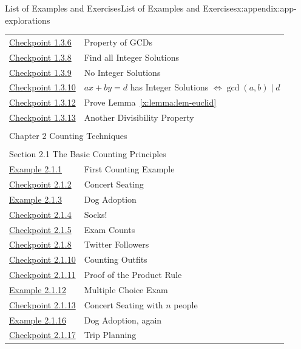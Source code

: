 \documentclass[oneside,10pt,]{book}
\newcommand{\xreffont}{\relax}
\numberwithin{equation}{section}
\begin{document}
\begin{appendixptx}{List of Examples and Exercises}{}{List of Examples and Exercises}{}{}{x:appendix:app-explorations}
\begin{longtable}[l]{ll}
\hyperref[x:exercise:ex-review-gcd-prop]{Checkpoint 1.3.6}& Property of GCDs\\
\hyperref[x:exercise:ex-review-bezout]{Checkpoint 1.3.8}& Find all Integer Solutions\\
\hyperref[x:exercise:ex-review-bezout-no-solution]{Checkpoint 1.3.9}& No Integer Solutions\\
\hyperref[x:exercise:ex-review-bezout-gcd]{Checkpoint 1.3.10}& \(ax + by = d\) has Integer Solutions \(\Leftrightarrow \gcd(a,b) \mid d\)\\
\hyperref[x:exercise:ex-review-euclid-proof]{Checkpoint 1.3.12}& Prove Lemma~{\xreffont\ref*{x:lemma:lem-euclid}}\\
\hyperref[x:exercise:ex-review-bezout-euclid]{Checkpoint 1.3.13}& Another Divisibility Property\\
\multicolumn{2}{l}{\null}\\[1.5ex] \multicolumn{2}{l}{\large Chapter 2 Counting Techniques}\\[0.5ex]
\multicolumn{2}{l}{\null}\\[1.5ex] \multicolumn{2}{l}{\large Section 2.1 The Basic Counting Principles}\\[0.5ex]
\hyperref[x:example:eg-counting-writing-project]{Example 2.1.1}& First Counting Example\\
\hyperref[x:exercise:ex-counting-coldplay]{Checkpoint 2.1.2}& Concert Seating\\
\hyperref[x:example:eg-counting-dogs]{Example 2.1.3}& Dog Adoption\\
\hyperref[x:exercise:ex-counting-socks]{Checkpoint 2.1.4}& Socks!\\
\hyperref[x:exercise:ex-counting-test-papers]{Checkpoint 2.1.5}& Exam Counts\\
\hyperref[x:exercise:ex-counting-twitter]{Checkpoint 2.1.8}& Twitter Followers\\
\hyperref[x:exercise:ex-counting-outfit]{Checkpoint 2.1.10}& Counting Outfits\\
\hyperref[x:exercise:ex-counting-prove-product]{Checkpoint 2.1.11}& Proof of the Product Rule\\
\hyperref[x:example:eg-counting-mcq]{Example 2.1.12}& Multiple Choice Exam\\
\hyperref[x:exercise:ex-counting-coldplay2]{Checkpoint 2.1.13}& Concert Seating with \(n\) people\\
\hyperref[x:example:eg-counting-dogs-again]{Example 2.1.16}& Dog Adoption, again\\
\hyperref[x:exercise:ex-counting-party-leaders]{Checkpoint 2.1.17}& Trip Planning\\

\end{longtable}
\end{appendixptx}
\end{document}
